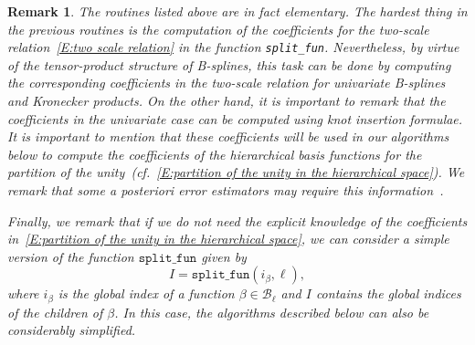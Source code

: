 \documentclass[a4paper]{siamltex1213}
\newtheorem{remark}[theorem]{Remark}
\newcommand\BB{\mathcal B}
\begin{document}
\begin{remark}\label{R:two-scale relation}
The routines listed above are in fact elementary. The \emph{hardest} thing in the previous routines is the computation of the coefficients for the two-scale relation~\eqref{E:two scale relation} in the function \texttt{split\_fun}. Nevertheless, by virtue of the tensor-product structure of B-splines, this task can be done by computing the corresponding coefficients in the two-scale relation for univariate B-splines and Kronecker products. On the other hand, it is important to remark that the coefficients in the univariate case can be computed using knot insertion formulae. 
It is important to mention that these coefficients will be used in our algorithms below to compute the coefficients of the hierarchical basis functions for the partition of the unity~(cf.~\eqref{E:partition of the unity in the hierarchical space}). We remark that some a posteriori error estimators may require this information~\cite{BG15b}.

Finally, we remark that if we do not need the explicit knowledge of the coefficients in~\eqref{E:partition of the unity in the hierarchical space}, we can consider a simple version of the function $\texttt{split\_fun}$ given by 
 $$I = \texttt{split\_fun} (i_\beta,\ell),$$ where $i_\beta$ is the global 
index of a function $\beta\in\BB_\ell$ and $I$ contains the global indices of 
the children of $\beta$. In this case, the algorithms described below can also be considerably simplified. 
\end{remark}
\end{document}
